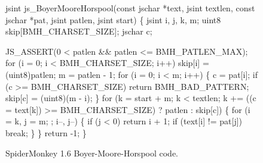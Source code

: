 \documentclass{svjour3}
\begin{document}
\begin{figure}
{%
\begin{code}
jsint
js\_BoyerMooreHorspool(const jschar *text, jsint textlen,
                      const jschar *pat, jsint patlen,
                      jsint start)
\{
  jsint i, j, k, m;
  uint8 skip[BMH\_CHARSET\_SIZE];
  jschar c;

  JS\_ASSERT(0 < patlen && patlen <= BMH\_PATLEN\_MAX);
  for (i = 0; i < BMH\_CHARSET\_SIZE; i++)
    skip[i] = (uint8)patlen;
  m = patlen - 1;
  for (i = 0; i < m; i++) \{
    c = pat[i];
    if (c >= BMH\_CHARSET\_SIZE)
      return BMH\_BAD\_PATTERN;
    skip[c] = (uint8)(m - i);
  \}
  for (k = start + m;
       k < textlen;
       k += ((c = text[k]) >= BMH\_CHARSET\_SIZE) ? 
             patlen : skip[c]) \{
    for (i = k, j = m; ; i--, j--) \{
      if (j < 0)
	return i + 1;
      if (text[i] != pat[j])
	break;
    \}
  \}
  return -1;
\}
\end{code}
}
\caption{SpiderMonkey 1.6 Boyer-Moore-Horspool code.}
\label{fig:bmh}
\end{figure}
\end{document}

